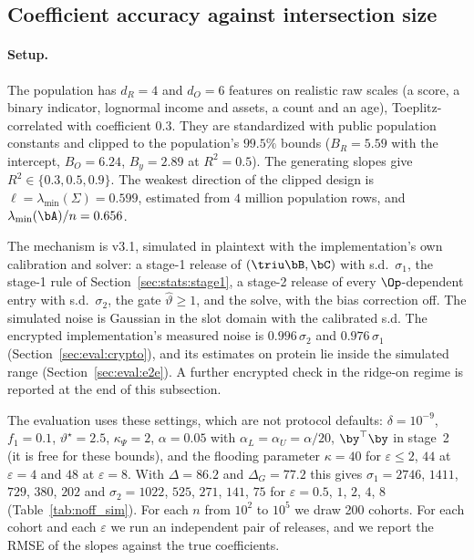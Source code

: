 \subsection{Coefficient accuracy against intersection size}
\label{sec:eval:sim}

\paragraph{Setup.} The population has $d_{R} = 4$ and $d_{O} = 6$ features on realistic raw scales (a score, a binary indicator, lognormal income and assets, a count and an age), Toeplitz-correlated with coefficient $0.3$. They are standardized with public population constants and clipped to the population's $99.5\%$ bounds ($B_{R} = 5.59$ with the intercept, $B_{O} = 6.24$, $B_{y} = 2.89$ at $R^2 = 0.5$). The generating slopes give $R^{2} \in \{0.3, 0.5, 0.9\}$. The weakest direction of the clipped design is $\ell = \lambda_{\min}(\Sigma) = 0.599$, estimated from $4$ million population rows, and $\lambda_{\min}(\bA)/n = 0.656$.

The mechanism is v3.1, simulated in plaintext with the implementation's own calibration and solver: a stage-1 release of $(\triu\bB, \bC)$ with s.d.\ $\sigma_1$, the stage-1 rule of Section~\ref{sec:stats:stage1}, a stage-2 release of every $\Op$-dependent entry with s.d.\ $\sigma_2$, the gate $\hat\vartheta \ge 1$, and the solve, with the bias correction off. The simulated noise is Gaussian in the slot domain with the calibrated s.d. The encrypted implementation's measured noise is $0.996\,\sigma_2$ and $0.976\,\sigma_1$ (Section~\ref{sec:eval:crypto}), and its estimates on protein lie inside the simulated range (Section~\ref{sec:eval:e2e}). A further encrypted check in the ridge-on regime is reported at the end of this subsection.

The evaluation uses these settings, which are not protocol defaults: $\delta = 10^{-9}$, $f_1 = 0.1$, $\vartheta^\star = 2.5$, $\kappa_\Psi = 2$, $\alpha = 0.05$ with $\alpha_L = \alpha_U = \alpha/20$, $\by^\top\by$ in stage~2 (it is free for these bounds), and the flooding parameter $\kappa = 40$ for $\varepsilon \le 2$, $44$ at $\varepsilon = 4$ and $48$ at $\varepsilon = 8$. With $\Delta = 86.2$ and $\Delta_G = 77.2$ this gives $\sigma_1 = 2746$, $1411$, $729$, $380$, $202$ and $\sigma_2 = 1022$, $525$, $271$, $141$, $75$ for $\varepsilon = 0.5$, $1$, $2$, $4$, $8$ (Table~\ref{tab:noff_sim}). For each $n$ from $10^{2}$ to $10^{5}$ we draw 200 cohorts. For each cohort and each $\varepsilon$ we run an independent pair of releases, and we report the RMSE of the slopes against the true coefficients.

